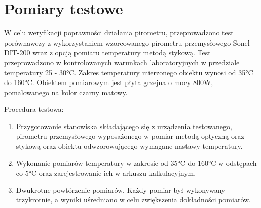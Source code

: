 
\chapter{Pomiary testowe}

W celu weryfikacji poprawności działania pirometru, przeprowadzono test porównawczy z wykorzystaniem wzorcowanego pirometru przemysłowego Sonel DIT-200 wraz z opcją pomiaru temperatury metodą stykową. Test przeprowadzono w kontrolowanych warunkach laboratoryjnych w przedziale temperatury 25 - 30°C. Zakres temperatury mierzonego obiektu wynosi od 35°C do 160°C. Obiektem pomiarowym jest płyta grzejna o mocy 800W, pomalowanego na kolor czarny matowy.

\vspace{12pt}

Procedura testowa:
\begin{enumerate}
\item Przygotowanie stanowiska składającego się z urządzenia testowanego,  pirometru przemysłowego wyposażonego w pomiar metodą optyczną oraz stykową oraz obiektu odwzorowującego wymagane nastawy temperatury. \item Wykonanie pomiarów temperatury w zakresie od 35°C do 160°C w odstępach co 5°C oraz zarejestrowanie ich w arkuszu kalkulacyjnym. \item Dwukrotne powtórzenie pomiarów. Każdy pomiar był wykonywany trzykrotnie, a wyniki uśredniano w celu zwiększenia dokładności pomiarów.
\end{enumerate}

\newpage

